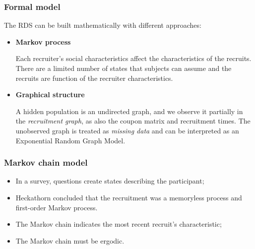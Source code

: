 \documentclass{beamer}
\newcommand{\Space}{\vspace{3ex}}
\begin{document}
\begin{frame}
  
  \frametitle{Formal model}

  The RDS can be built mathematically with different approaches: 

  \Space

  \begin{itemize}
    \justifying

    \item<1> {\bf Markov process} \cite{heckathorn1997}
  
    Each recruiter's social characteristics affect the characteristics of the
    recruits. There are a limited number of states that subjects can assume and
    the recruits are function of the recruiter characteristics.
  \end{itemize}

  \Space

  \begin{itemize}
    \justifying

    \item<2> {\bf Graphical structure} \cite{crawford2016}
    
    A hidden population is an undirected graph, and we observe it partially in
    the {\em recruitment graph}, as also the coupon matrix and recruitment
    times. The unobserved graph is treated as {\em missing data} and can be
    interpreted as an Exponential Random Graph Model.
  \end{itemize}  

\end{frame}

\begin{frame}
  \frametitle{Markov chain model}
  
  \begin{itemize}
    \justifying
    \item<1> In a survey, questions create states describing the participant;
    
    \Space
  
    \item<2> Heckathorn concluded that the recruitment was a memoryless
    process and first-order Markov process.
    
    \Space

    \item<3> The Markov chain indicates the most recent recruit's characteristic;
    
    \Space
  
    \item<4> The Markov chain must be ergodic. 
  \end{itemize}
  
  \end{frame}
\end{document}
